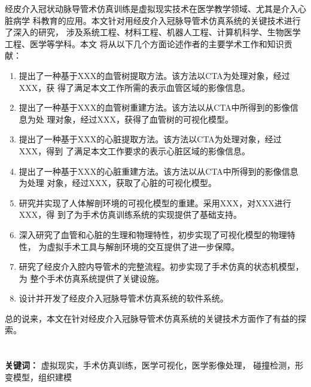 经皮介入冠状动脉导管术仿真训练是虚拟现实技术在医学教学领域、尤其是介入心脏病学
科教育的应用。本文针对用经皮介入冠脉导管术仿真系统的关键技术进行了深入的研究，
涉及系统工程、材料工程、机器人工程、计算机科学、生物医学工程、医学等学科。本文
将从以下几个方面论述作者的主要学术工作和知识贡献：
\begin{enumerate}
    \item 提出了一种基于XXX的血管树提取方法。该方法以CTA为处理对象，经过XXX，获
    得了满足本文工作所需的表示血管区域的影像信息。
    \item 提出了一种基于XXX的血管树重建方法。该方法以从CTA中所得到的影像信息为处
    理对象，经过XXX，获得了血管树的可视化模型。
    \item 提出了一种基于XXX的心脏提取方法。该方法以CTA为处理对象，经过XXX，得到
    了满足本文工作要求的表示心脏区域的影像信息。
    \item 提出了一种基于XXX的心脏重建方法。该方法以从CTA中所得到的影像信息为处理
    对象，经过XXX，获取了心脏的可视化模型。
    \item 研究并实现了人体解剖环境的可视化模型的重建。采用XXX，对XXX进行XXX，得
    到了为手术仿真训练系统的实现提供了基础支持。
    \item 深入研究了血管和心脏的生理和物理特性，初步实现了可视化模型的物理特性，
    为虚拟手术工具与解剖环境的交互提供了进一步保障。
    \item 研究了经皮介入腔内导管术的完整流程。初步实现了手术仿真的状态机模型，为
    整个手术仿真系统提供了关键设施。
    \item 设计并开发了经皮介入冠脉导管术仿真系统的软件系统。
\end{enumerate}
总的说来，本文在针对经皮介入冠脉导管术仿真系统的关键技术方面作了有益的探索。
\\
\\
\\
\noindent \textbf{关键词：} 虚拟现实，手术仿真训练，医学可视化，医学影像处理，
碰撞检测，形变模型，组织建模
